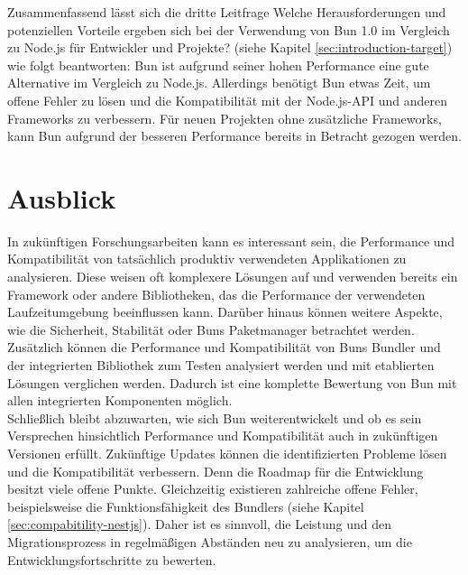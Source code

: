 \noindent
Zusammenfassend lässt sich die dritte Leitfrage \glqq Welche Herausforderungen und potenziellen Vorteile ergeben sich bei der Verwendung von Bun 1.0 im Vergleich zu Node.js für Entwickler und Projekte?\grqq{} (siehe Kapitel \ref{sec:introduction-target}) wie folgt beantworten: Bun ist aufgrund seiner hohen Performance eine gute Alternative im Vergleich zu Node.js. Allerdings benötigt Bun etwas Zeit, um offene Fehler zu lösen und die Kompatibilität mit der Node.js-API und anderen Frameworks zu verbessern. Für neuen Projekten ohne zusätzliche Frameworks, kann Bun aufgrund der besseren Performance bereits in Betracht gezogen werden.


\section{Ausblick} \label{sec:finalThoughts-outlook}
In zukünftigen Forschungsarbeiten kann es interessant sein, die Performance und Kompatibilität von tatsächlich produktiv verwendeten Applikationen zu analysieren. Diese weisen oft komplexere Lösungen auf und verwenden bereits ein Framework oder andere Bibliotheken, das die Performance der verwendeten Laufzeitumgebung beeinflussen kann. Darüber hinaus können weitere Aspekte, wie die Sicherheit, Stabilität oder Buns Paketmanager betrachtet werden. Zusätzlich können die Performance und Kompatibilität von Buns Bundler und der integrierten Bibliothek zum Testen analysiert werden und mit etablierten Lösungen verglichen werden. Dadurch ist eine komplette Bewertung von Bun mit allen integrierten Komponenten möglich.\\

\noindent
Schließlich bleibt abzuwarten, wie sich Bun weiterentwickelt und ob es sein Versprechen hinsichtlich Performance und Kompatibilität auch in zukünftigen Versionen erfüllt. Zukünftige Updates können die identifizierten Probleme lösen und die Kompatibilität verbessern. Denn die Roadmap für die Entwicklung besitzt viele offene Punkte. Gleichzeitig existieren zahlreiche offene Fehler, beispielsweise die Funktionsfähigkeit des Bundlers (siehe Kapitel \ref{sec:compabitility-nestjs}). Daher ist es sinnvoll, die Leistung und den Migrationsprozess in regelmäßigen Abständen neu zu analysieren, um die Entwicklungsfortschritte zu bewerten.
